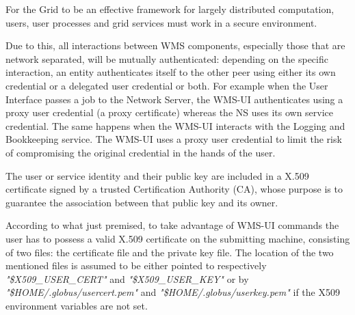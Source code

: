  
For the Grid to be an effective framework for largely distributed computation, users, user processes 
and grid services must work in a secure environment.
 
Due to this, all interactions between WMS components, especially those that are network separated, will be 
mutually authenticated: depending on the specific interaction, an entity authenticates itself to the 
other peer using either its own credential or a delegated user credential or both. For example when the 
User Interface passes a job to the Network Server, the WMS-UI authenticates using a proxy user credential 
(a proxy certificate) whereas the NS uses its own service credential. The same happens when the WMS-UI 
interacts with the Logging and Bookkeeping service. The WMS-UI uses a proxy user credential to limit the risk 
of compromising the original credential in the hands of the user. 
 
The user or service identity and their public key are included in a X.509 certificate signed by a trusted 
Certification Authority (CA), whose purpose is to guarantee the association between that public key and its 
owner.

According to what just premised, to take advantage of WMS-UI commands the user has to possess a valid X.509 
certificate on the submitting machine, consisting of two files: the certificate file and the private 
key file. The location of the two mentioned files is assumed to be either pointed to respectively 
\textit{"\$X509\_USER\_CERT"} and \textit{"\$X509\_USER\_KEY"} or 
by \textit{"\$HOME\-/.globus\-/usercert.pem"} and \textit{"\$HOME\-/.globus/\-userkey.pem"} if the 
X509 environment variables are not set. 

\medskip


